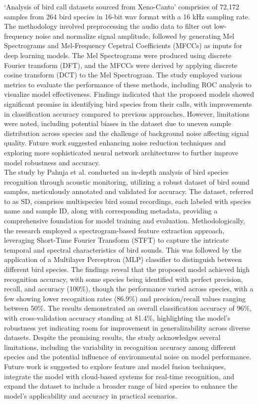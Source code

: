 `Analysis of bird call datasets sourced from
Xeno-Canto'\cite{wang2022efficient}  comprisies of 72,172 samples from 264 bird species in 16-bit wav
format with a 16 kHz sampling rate. The methodology involved preprocessing the
audio data to filter out low-frequency noise and normalize signal amplitude,
followed by generating Mel Spectrograms and Mel-Frequency Cepstral Coefficients
(MFCCs) as inputs for deep learning models. The Mel Spectrograms were produced
using discrete Fourier transform (DFT), and the MFCCs were derived by applying
discrete cosine transform (DCT) to the Mel Spectrogram. The study employed
various metrics to evaluate the performance of these methods, including ROC
analysis to visualize model effectiveness. Findings indicated that the proposed
models showed significant promise in identifying bird species from their calls,
with improvements in classification accuracy compared to previous approaches.
However, limitations were noted, including potential biases in the dataset due
to uneven sample distribution across species and the challenge of background
noise affecting signal quality. Future work suggested enhancing noise reduction
techniques and exploring more sophisticated neural network architectures to
further improve model robustness and accuracy.\\

The study\cite{pahuja2021sound} by Pahuja et al. conducted an in-depth analysis
of bird species recognition through acoustic monitoring, utilizing a robust
dataset of bird sound samples, meticulously annotated and validated for
accuracy. The dataset, referred to as SD, comprises multispecies bird sound
recordings, each labeled with species name and sample ID, along with
corresponding metadata, providing a comprehensive foundation for model training
and evaluation. Methodologically, the research employed a spectrogram-based
feature extraction approach, leveraging Short-Time Fourier Transform (STFT) to
capture the intricate temporal and spectral characteristics of bird sounds.
This was followed by the application of a Multilayer Perceptron (MLP)
classifier to distinguish between different bird species. The findings reveal
that the proposed model achieved high recognition accuracy, with some species
being identified with perfect precision, recall, and accuracy (100\%), though
the performance varied across species, with a few showing lower recognition
rates (86.9\%) and precision/recall values ranging between 50\%. The
results demonstrated an overall classification accuracy of 96\%, with
cross-validation accuracy standing at 81.4\%, highlighting the model's
robustness yet indicating room for improvement in generalizability across
diverse datasets. Despite the promising results, the study acknowledges several
limitations, including the variability in recognition accuracy among different
species and the potential influence of environmental noise on model
performance. Future work is suggested to explore feature and model fusion
techniques, integrate the model with cloud-based systems for real-time
recognition, and expand the dataset to include a broader range of bird species
to enhance the model's applicability and accuracy in practical scenarios.\\


